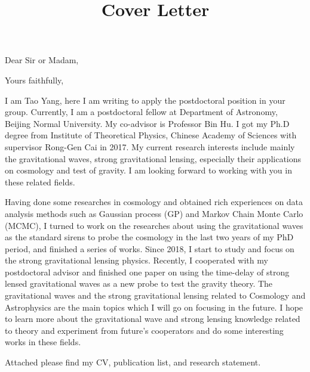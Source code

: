\documentclass[11pt,letterpaper,sans]{moderncv}   %
\title{Cover Letter}
\begin{document}
\opening{Dear Sir or Madam,}
\closing{Yours faithfully,}
\makelettertitle

I am Tao Yang, here I am writing to apply the postdoctoral position in your group. Currently, I am a postdoctoral fellow at Department of Astronomy, Beijing Normal University. My co-advisor is Professor Bin Hu.  I got my Ph.D degree from Institute of Theoretical Physics, Chinese
Academy of Sciences  with supervisor Rong-Gen Cai in 2017. My current research interests include mainly the gravitational waves, strong gravitational lensing, especially their applications on cosmology and test of gravity. I am looking forward to working with you in these related fields.

Having done some researches in cosmology and obtained rich experiences on data analysis methods such as
Gaussian process (GP) and Markov Chain Monte Carlo (MCMC), I turned to work on the researches about
using the gravitational waves as the standard sirens to probe the cosmology in the last two years of my PhD
period, and finished a series of works. Since 2018, I start to study and focus on the strong gravitational lensing physics. Recently, I cooperated with my
postdoctoral advisor and finished one paper on using the time-delay of strong lensed gravitational waves as a
new probe to test the gravity theory. The gravitational waves and the strong gravitational lensing related to
Cosmology and Astrophysics are the main topics which I will go on focusing in the future. I hope to learn more about the gravitational wave and strong lensing
knowledge related to theory and experiment from future’s cooperators and do some interesting works in these
fields.

Attached please find my CV, publication list, and research statement. 


\vspace{10mm}

\makeletterclosing
\end{document}
